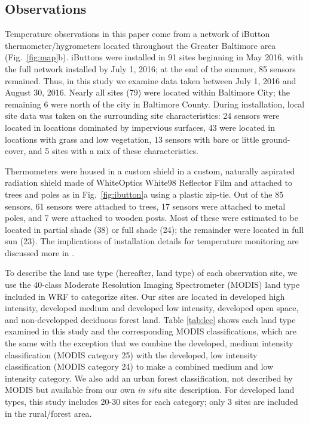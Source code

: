 \subsection{Observations}
Temperature observations in this paper come from a network of iButton thermometer/hygrometers located throughout the Greater Baltimore area (Fig.~\ref{fig:map}b). 
iButtons were installed in 91 sites beginning in May 2016, with the full network installed by July 1, 2016; at the end of the summer, 85 sensors remained. Thus, in this study we examine data taken between July 1, 2016 and August 30, 2016. Nearly all sites (79) were located within Baltimore City; the remaining 6 were north of the city in Baltimore County. During installation, local site data was taken on the surrounding site characteristics: 24 sensors were located in locations dominated by impervious surfaces, 43 were located in locations with grass and low vegetation, 13 sensors with bare or little ground-cover, and 5 sites with a mix of these characteristics. 

Thermometers were housed in a custom shield in a custom, naturally aspirated radiation shield made of WhiteOptics White98 Reflector Film and attached to trees and poles as in Fig.~\ref{fig:ibutton}a using a plastic zip-tie. Out of the 85 sensors, 61 sensors were attached to trees, 17 sensors were attached to metal poles, and 7 were attached to wooden posts. Most of these were estimated to be located in partial shade (38) or full shade (24); the remainder were located in full sun (23). The implications of installation details for temperature monitoring are discussed more in \cite{scott2017intraurban}.

 To describe the land use type (hereafter, land type) of each observation site, we use the 40-class Moderate Resolution Imaging Spectrometer (MODIS) land type included in WRF to categorize sites. Our sites are located in developed high intensity, developed medium and developed low intensity, developed open space, and non-developped deciduous forest land.
 Table \ref{tab:lcc} shows each land type examined in this study and the corresponding MODIS classifications, which are the same with the exception that we combine the developed, medium intensity classification (MODIS category 25) with the developed, low intensity classification (MODIS category 24) to make a combined medium and low intensity category. We also add an urban forest classification, not described by MODIS but available from our own \textit{in situ} site description. 
For developed land types, this study includes 20-30 sites for each category; only 3 sites are included in the rural/forest area. 

